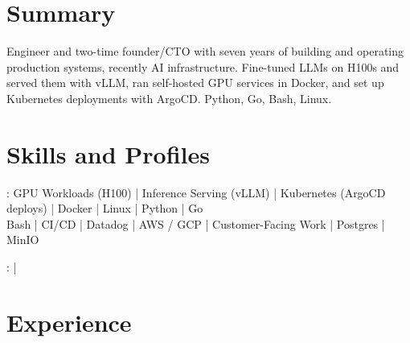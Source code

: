 \documentclass[print]{jack-resume}
\begin{document}
\pagecolor{darkmodeBackground}


\begin{minipage}[t][1cm][t]{.03\textwidth}
    \hfill
\end{minipage}

\section{Summary}
Engineer and two-time founder/CTO with seven years of building and operating production systems, recently AI infrastructure. Fine-tuned LLMs on H100s and served them with vLLM, ran self-hosted GPU services in Docker, and set up Kubernetes deployments with ArgoCD. Python, Go, Bash, Linux.
\sectionsep

\section{Skills and Profiles}
:
GPU Workloads (H100) \hfill | \hfill
Inference Serving (vLLM) \hfill | \hfill
Kubernetes (ArgoCD deploys) \hfill | \hfill
Docker \hfill | \hfill
Linux \hfill | \hfill
Python \hfill | \hfill
Go \\
\hspace{1.0cm} Bash \hfill | \hfill
CI/CD \hfill | \hfill
Datadog \hfill | \hfill
AWS / GCP \hfill | \hfill
Customer-Facing Work \hfill | \hfill
Postgres \hfill | \hfill
MinIO \\

\raggedright{
    :
      \href{https://www.linkedin.com/in/jack-sturtevant/}{ \ExternalLink} |
     \href{https://github.com/jacksturt}{ \ExternalLink}}

\section{Experience}
\end{document}

